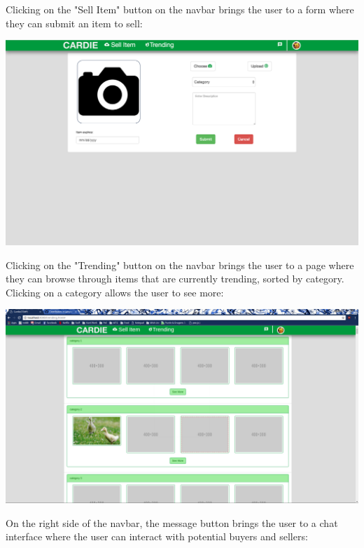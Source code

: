 \documentclass[10pt, titlepage]{article}
\begin{document}
\noindent Clicking on the "Sell Item" button on the navbar brings the user to a form where they can submit an item to sell: \\

\centerline{\includegraphics[scale=.4]{screen_07}}


\pagebreak

\noindent Clicking on the "Trending" button on the navbar brings the user to a page where they can browse through items that are currently trending, sorted by category. Clicking on a category allows the user to see more: \\

\centerline{\includegraphics[scale=.25]{screen_05}}

\pagebreak

\noindent On the right side of the navbar, the message button brings the user to a chat interface where the user can interact with potential buyers and sellers: \\
\end{document}
